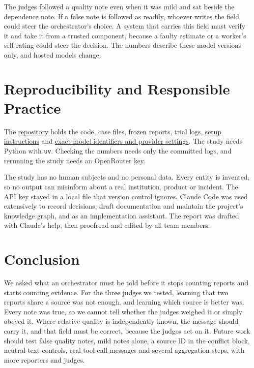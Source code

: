 \documentclass[11pt]{article}
\makeatletter
\renewcommand{\paragraph}{\@startsection{paragraph}{4}{\z@}{1.2ex \@plus .4ex \@minus .2ex}{-1em}{\normalfont\normalsize\bfseries}}
\newcommand{\repo}{https://github.com/JasonOng0109/dsa4213-agent-project}
\makeatother
\begin{document}
\paragraph{Risks.}
The judges followed a quality note even when it was mild and sat beside the dependence note. If a false note is followed as readily, whoever writes the field could steer the orchestrator's choice. A system that carries this field must verify it and take it from a trusted component, because a faulty estimate or a worker's self-rating could steer the decision. The numbers describe these model versions only, and hosted models change.

\section{Reproducibility and Responsible Practice}
\label{sec:repro}
The \href{\repo}{repository} holds the code, case files, frozen reports, trial logs, \href{https://github.com/JasonOng0109/dsa4213-agent-project/tree/8a6de34#running-the-study}{setup instructions} and \href{https://github.com/JasonOng0109/dsa4213-agent-project/blob/8a6de34/pipeline/run.py}{exact model identifiers and provider settings}. The study needs Python with \texttt{uv}. Checking the numbers needs only the committed logs, and rerunning the study needs an OpenRouter key.

The study has no human subjects and no personal data. Every entity is invented, so no output can misinform about a real institution, product or incident. The API key stayed in a local file that version control ignores. Claude Code was used extensively to record decisions, draft documentation and maintain the project's knowledge graph, and as an implementation assistant. The report was drafted with Claude's help, then proofread and edited by all team members.

\section{Conclusion}
\label{sec:conclusion}
We asked what an orchestrator must be told before it stops counting reports and starts counting evidence. For the three judges we tested, learning that two reports share a source was not enough, and learning which source is better was. Every note was true, so we cannot tell whether the judges weighed it or simply obeyed it. Where relative quality is independently known, the message should carry it, and that field must be correct, because the judges act on it. Future work should test false quality notes, mild notes alone, a source ID in the conflict block, neutral-text controls, real tool-call messages and several aggregation steps, with more reporters and judges.
\label{main:lastpage}
\end{document}
